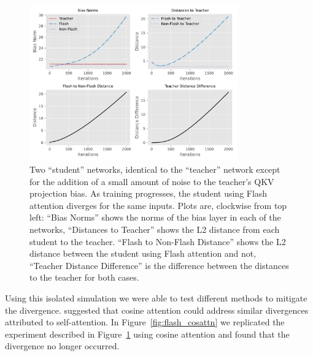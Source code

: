 \documentclass{article}
\begin{document}
\begin{figure}
    \centering
    \includegraphics[width=0.8\textwidth]{figures/flash_drift.pdf}
    \caption{%
        Two ``student'' networks, identical to the ``teacher'' network except
        for the addition of a small amount of noise to the teacher's QKV
        projection bias. As training progresses, the student using Flash
        attention diverges for the same inputs. Plots are, clockwise from top
        left: ``Bias Norms'' shows the norms of the bias layer in each of the
        networks, ``Distances to Teacher'' shows the L2 distance from each
        student to the teacher. ``Flash to Non-Flash Distance'' shows the L2
        distance between the student using Flash attention and not,
        ``Teacher Distance Difference'' is the
        difference between the distances to the teacher for both cases.}
    \label{fig:flash_drift}
\end{figure}

Using this isolated simulation we were able to test different methods to
mitigate the divergence. \citet{karras2024edm2} suggested that cosine attention
could address similar divergences attributed to self-attention. In
Figure~\ref{fig:flash_cosattn} we replicated the experiment described in
Figure~\ref{fig:flash_drift} using cosine attention and found that the
divergence no longer occurred.
\end{document}
